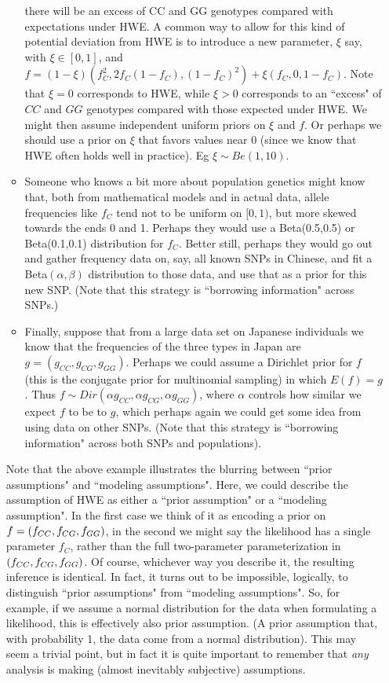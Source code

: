 \documentclass[12pt]{article}
\begin{document}
\begin{enumerate}
\begin{itemize}
  there will be an excess of CC and GG genotypes compared with expectations under HWE.
   A common way to allow for this kind of potential deviation from HWE is to introduce a new parameter, $\xi$ say, with $\xi \in [0,1]$, and
 $f=(1-\xi)(f_C^2, 2f_C(1-f_C),(1-f_C)^2) + \xi(f_C,0,1-f_C)$. Note that $\xi=0$ corresponds to HWE, while $\xi>0$ corresponds to an ``excess" of $CC$ and $GG$ genotypes
 compared with those expected under HWE. We might then assume independent uniform priors on $\xi$ and $f$. Or perhaps we should use a prior
 on $\xi$ that favors values near 0 (since we know that HWE often holds well in practice). Eg $\xi \sim Be(1,10)$.    
 \item Someone who knows a bit more about population genetics might know that, both from mathematical models and in actual data, allele frequencies like $f_C$ tend not to be uniform on $[0,1)$, but more skewed towards the ends 0 and 1. Perhaps they would use a Beta(0.5,0.5) or Beta(0.1,0.1) distribution for $f_C$. Better still, perhaps they would go out and gather frequency data on, say, all known SNPs in Chinese, and fit a Beta$(\alpha, \beta)$ distribution to those data,
 and use that as a prior for this new SNP. (Note that this strategy is ``borrowing information" across SNPs.)
 \item  Finally, suppose that from a large data set on Japanese individuals we know that the frequencies of the three types in Japan are $g=(g_{CC},g_{CG},g_{GG})$. Perhaps we could
 assume a Dirichlet prior for $f$ (this is the
 conjugate prior for multinomial sampling) in which $E(f)=g$. Thus $f \sim Dir(\alpha g_{CC},\alpha g_{CG}, \alpha g_{GG})$, where $\alpha$ controls how similar we expect $f$ to be to $g$, which 
 perhaps again we could get some idea from using data on other SNPs. (Note that this strategy
 is ``borrowing information" across both SNPs and populations).
   \end{itemize}
 Note that the above example illustrates the blurring between ``prior assumptions" and ``modeling assumptions". Here, we could describe the assumption of HWE as either
 a ``prior assumption" or a ``modeling assumption". In the first case we think of it as encoding a prior on $f=(f_{CC},f_{CG},f_{GG})$, in the second we might say the
 likelihood has a single parameter $f_C$, rather than the full two-parameter parameterization in $(f_{CC},f_{CG},f_{GG})$.
 Of course, whichever way you describe it, the resulting inference is identical.
 In fact, it turns out to be impossible, logically, to distinguish ``prior assumptions" from ``modeling assumptions". 
 So, for example, if we assume a normal distribution for the data when formulating a likelihood, this is effectively also prior assumption.
(A prior assumption that, with probability 1, the data come from a normal distribution). This may seem a trivial point, but in fact it is quite important
to remember that {\it any} analysis is making (almost inevitably subjective) assumptions. 


\end{enumerate}
\end{document}
